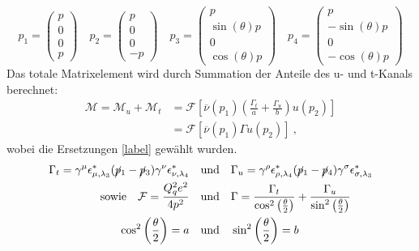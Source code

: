 \begin{equation}
p_1 = \left(\begin{array}{c}p \\ 0 \\ 0 \\ p\end{array}\right) \quad 	p_2 = \left(\begin{array}{c}p \\ 0 \\ 0 \\ -p\end{array}\right) \quad p_3 = \left(\begin{array}{c}p \\ \sin(\theta)p \\ 0 \\ \cos(\theta)p \end{array}\right) \quad p_4 = \left(\begin{array}{c}p \\ -\sin(\theta)p \\ 0 \\ -\cos(\theta)p \end{array}\right)
\end{equation}
Das totale Matrixelement wird durch Summation der Anteile des u- und t-Kanals berechnet: 
\begin{equation}
\begin{aligned}
\mathcal{M} = \mathcal{M}_u + \mathcal{M}_t &= \mathcal{F} \left[\overline{\nu}(p_1) \left(\frac{\Gamma_t}{a}  +
\frac{\Gamma_u}{b} \right) u(p_2) \right] \\
&= \mathcal{F} \left[ \overline{\nu}(p_1) \Gamma u(p_2)\right]~,
\end{aligned}
\end{equation}
wobei die Ersetzungen \autoref{label} gewählt wurden.
\begin{equation}
\begin{split}
\Gamma_t = \gamma^\mu \epsilon^*_{\mu, \lambda_3} (\cancel{p}_1- \cancel{p}_3)  \gamma^\nu \epsilon^*_{\nu, \lambda_4} \quad &\text{und} \quad \Gamma_u = \gamma^\rho \epsilon^*_{\rho, \lambda_4} (\cancel{p}_1- \cancel{p}_4)  \gamma^\sigma \epsilon^*_{\sigma, \lambda_3} \\
\text{sowie} \quad \mathcal{F} = \frac{Q_q^2e^2}{4p^2} \quad &\text{und} \quad \Gamma = \frac{\Gamma_t}{\cos^2\left(\frac{\theta}{2}\right)}  +
\frac{\Gamma_u}{\sin^2\left(\frac{\theta}{2}\right)} \\
\cos^2\left(\frac{\theta}{2}\right) = a \quad &\text{und} \quad \sin^2\left(\frac{\theta}{2}\right) = b
\end{split}
\end{equation}
